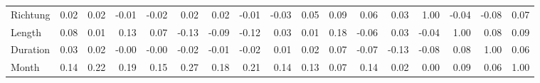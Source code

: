 \begin{tabular}{lrrrrrrrrrrrrrrrr}
Richtung &  0.02 &  0.02 & -0.01 & -0.02 &   0.02 &   0.02 & -0.01 &  -0.03 &   0.05 & 0.09 &  0.06 &    0.03 &      1.00 &   -0.04 &     -0.08 &   0.07 \\
Length   &  0.08 &  0.01 &  0.13 &  0.07 &  -0.13 &  -0.09 & -0.12 &   0.03 &   0.01 & 0.18 & -0.06 &    0.03 &     -0.04 &    1.00 &      0.08 &   0.09 \\
Duration &  0.03 &  0.02 & -0.00 & -0.00 &  -0.02 &  -0.01 & -0.02 &   0.01 &   0.02 & 0.07 & -0.07 &   -0.13 &     -0.08 &    0.08 &      1.00 &   0.06 \\
Month    &  0.14 &  0.22 &  0.19 &  0.15 &   0.27 &   0.18 &  0.21 &   0.14 &   0.13 & 0.07 &  0.14 &    0.02 &      0.00 &    0.09 &      0.06 &   1.00 \\
\bottomrule
\end{tabular}
